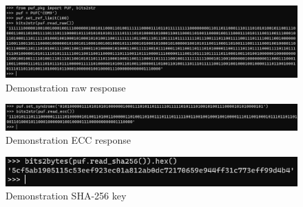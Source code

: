 \begin{figure}[H]
    \centering
    \includegraphics[width=\linewidth]{images/demo_raw.png}
    \caption{Demonstration raw response}
    \label{fig:demo_raw}
\end{figure}

\begin{figure}[H]
    \centering
    \includegraphics[width=\linewidth]{images/demo_ecc.png}
    \caption{Demonstration ECC response}
    \label{fig:demo_ecc}
\end{figure}

\begin{figure}[H]
    \centering
    \includegraphics[width=\linewidth]{images/demo_sha.png}
    \caption{Demonstration SHA-256 key}
    \label{fig:demo_sha}
\end{figure}



